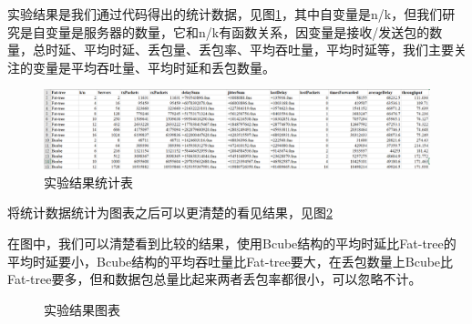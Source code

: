 \documentclass[lang=cn,11pt,a4paper,cite=authoryear]{elegantpaper}
\begin{document}
实验结果是我们通过代码得出的统计数据，见图\ref{fig:screenshot052}，其中自变量是n/k，但我们研究是自变量是服务器的数量，它和n/k有函数关系，因变量是接收/发送包的数量，总时延、平均时延、丢包量、丢包率、平均吞吐量，平均时延等，我们主要关注的变量是平均吞吐量、平均时延和丢包数量。

\begin{figure}[htbp]
	\centering
	\includegraphics[width=\linewidth]{image/screenshot052}
	\caption{实验结果统计表}
	\label{fig:screenshot052}
\end{figure}

将统计数据统计为图表之后可以更清楚的看见结果，见图\ref{fig:result}

在图中，我们可以清楚看到比较的结果，使用Bcube结构的平均时延比Fat-tree的平均时延要小，Bcube结构的平均吞吐量比Fat-tree要大，在丢包数量上Bcube比Fat-tree要多，但和数据包总量比起来两者丢包率都很小，可以忽略不计。

\begin{figure}[htbp]
	\centering
	\caption{实验结果图表}
	\label{fig:result}
\end{figure}
\end{document}
